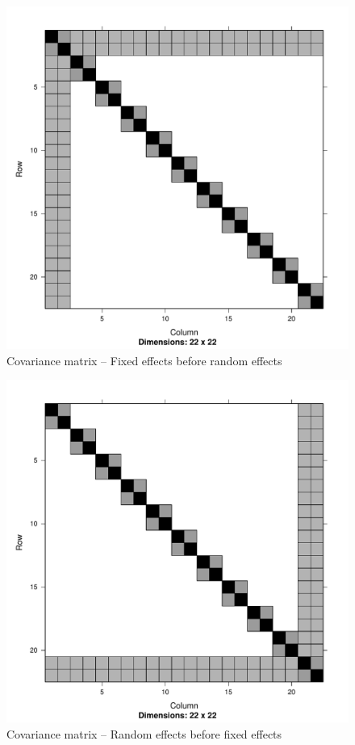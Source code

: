 	\begin{figure}[p]
		\includegraphics[width=0.95 \textwidth]{mX_mZ_mLambda.pdf}
		\caption{Covariance matrix -- Fixed effects before random effects}
		\label{fig:covfixedrandom}
	\end{figure}
		
	\begin{figure}[p]
		\includegraphics[width=0.95 \textwidth]{mZ_mX_mLambda.pdf}
		\caption{Covariance matrix -- Random effects before fixed effects}
		\label{fig:covrandomfixed}
	\end{figure}
							      				      			      			      			      	
